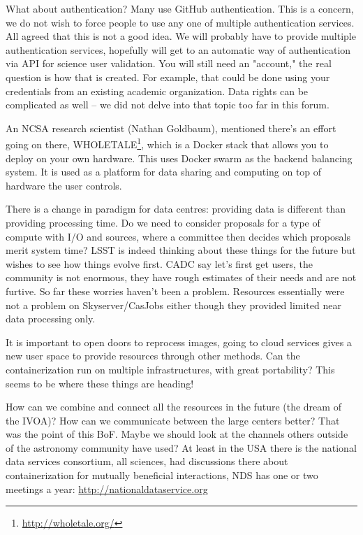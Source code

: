 \documentclass[11pt,twoside]{article}
\begin{document}
What about authentication? Many use GitHub authentication. This is a concern, we do not wish to  force people to use any one of multiple authentication services. All agreed that this is not a good idea.
We will probably have to provide multiple authentication services, hopefully will get to an automatic way of authentication via API for science user validation.
You will still need an "account," the real question is how that is created.
For example, that could be done using your credentials from an existing academic organization.
Data rights can be complicated as well -- we did not delve into that topic too far in this forum.


An NCSA research scientist (Nathan Goldbaum), mentioned there's an effort going on there, WHOLETALE\footnote{\url{http://wholetale.org/}},  which is a Docker stack that allows you to deploy on your own hardware. This uses Docker swarm as the backend balancing system. It is used as a platform for data sharing and computing on top of hardware the user controls.

There is a change in paradigm for data centres: providing data is different than providing processing time.
Do we need to consider proposals for a type of compute with I/O and sources, where  a committee then decides which proposals merit system time?
LSST is indeed thinking about these things for the future but wishes to see how things evolve first.
CADC say let's first get users, the community is not enormous, they have rough estimates of their needs and are not furtive.
So far these worries haven't been a problem. Resources essentially were not a problem on Skyserver/CasJobs either though they provided limited near data processing only.

It is important to open doors to reprocess images, going to cloud services gives a new user space to provide resources through other methods. Can the containerization run on multiple infrastructures, with great portability?
This seems to be where these things are heading!


How can we combine and connect all the resources in the future (the dream of the IVOA)?
How can we communicate between the large centers better?
That was the point of this BoF.
Maybe we should look at the channels others outside of the astronomy community have used?
At least in the USA there is the  national data services consortium, all sciences, had discussions there about containerization for mutually beneficial interactions, NDS has one or two meetings a year: \url{http://nationaldataservice.org}
\end{document}
